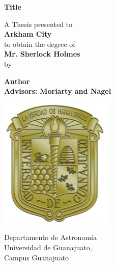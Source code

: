 \begin{titlepage}
    \begin{center}
        \vspace*{1cm}
        
        \Huge
        \textbf{Title}
        \vspace{1.5cm}
        
        \Large
         A Thesis presented to\\
         \LARGE
         \textbf{Arkham City}\\
        \large 
        to obtain the degree of\\
        \LARGE
        \textbf{Mr. Sherlock Holmes}\\ 
        \large
        by
        
        \LARGE
        \textbf{Author}\\
        \vfill
        \LARGE
        \textbf{Advisors:}
        \textbf{Moriarty and Nagel}
        
        
        \vspace{0.8cm}
        
        \includegraphics[width=0.4\textwidth]{images/UGTO.png}
        
        \Large
        Departamento de Astronomía\\
        Universidad de Guanajuato,\\
        Campus Guanajuato
    \end{center}
\end{titlepage}
